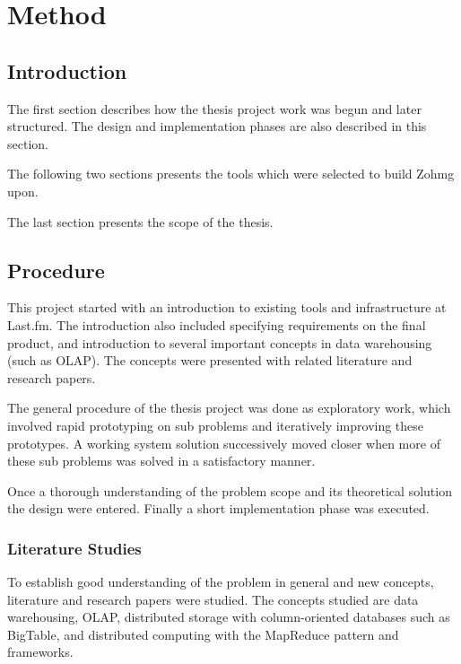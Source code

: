 \chapter{Method}



\section*{Introduction}

The first section describes how the thesis project work was begun and later
structured. The design and implementation phases are also described in this
section.

The following two sections presents the tools which were selected to build Zohmg
upon.

The last section presents the scope of the thesis.


\section{Procedure}

This project started with an introduction to existing tools and infrastructure
at Last.fm. The introduction also included specifying requirements on the final
product, and introduction to several important concepts in data warehousing
(such as OLAP). The concepts were presented with related literature and research
papers.

The general procedure of the thesis project was done as exploratory work, which
involved rapid prototyping on sub problems and iteratively improving these
prototypes. A working system solution successively moved closer when more of
these sub problems was solved in a satisfactory manner.

Once a thorough understanding of the problem scope and its theoretical solution
the design were entered. Finally a short implementation phase was executed.


\subsection*{Literature Studies}

To establish good understanding of the problem in general and new concepts,
literature and research papers were studied. The concepts studied are data
warehousing, OLAP, distributed storage with column-oriented databases such
as BigTable, and distributed computing with the MapReduce pattern and
frameworks.

